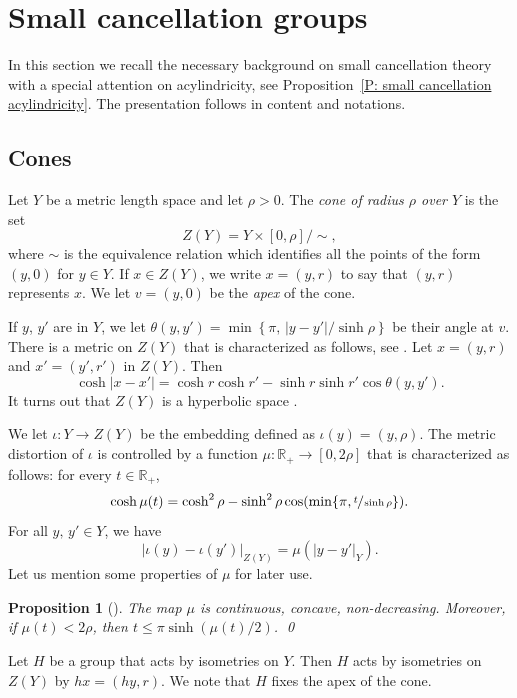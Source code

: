 \documentclass[11pt]{article}
\theoremstyle{plain}
\newtheorem{prop}[thm]{Proposition}
\theoremstyle{definition}
\begin{document}
\section{Small cancellation groups}
In this section we recall the necessary background on small cancellation theory with a special attention on acylindricity, see Proposition~\ref{P: small cancellation acylindricity}.
The presentation follows \cite{coulon_geometry_2014} in content and notations.

\subsection{Cones}

Let $Y$ be a metric length space and let $\rho>0$.
The \emph{cone of radius $\rho$ over $Y$} is the set
\[
Z(Y)= Y\times [0,\rho]/\sim,
\]
where $\sim$ is the equivalence relation which identifies all the points of the form $(y,0)$ for $y \in Y$.
If $x\in Z (Y)$, we write $x=(y,r)$ to say that $(y,r)$ represents $x$. We let $v=(y,0)$ be the \emph{apex} of the cone.

If $y$, $y'$ are in $Y$, we let $\theta(y,y')=\min\left\{ \pi,\, |y-y'|/\sinh\rho\right\}$ be their angle at $v$. There is a metric on $Z(Y)$ that is characterized as follows, see \cite[Ch.\,I.5]{bridson_metric_1999}.
Let $x=(y,r)$ and $x'=(y',r')$ in $Z(Y)$. Then
\[
\cosh |x-x'| = \cosh r \cosh r' -\sinh r \sinh r' \cos \theta (y,y').
\]
It turns out that $Z(Y)$ is a hyperbolic space \cite[Prop.\,4.6]{coulon_geometry_2014}.

We let $\iota: Y \to Z(Y)$ be the embedding defined as $\iota(y)=(y,\rho)$. The metric distortion of $\iota$ is controlled by a function $\mu: \mathbb{R}_+ \to [0,2\rho]$ that is characterized as follows: for every $ t\in \mathbb{R}_+$,
\[
\cosh \mu(t) = \cosh^2 \rho - \sinh^2 \rho \cos( \min\{\pi, \sfrac t{\sinh \rho}\}).
\]
For all $y,\, y' \in Y$, we have
\begin{equation}
\label{L: distortion} |\iota(y)-\iota(y')|_{Z(Y)}=\mu(|y-y'|_Y).
\end{equation}
Let us mention some properties of $\mu$ for later use.

\begin{prop}[{\cite[Prop.\,4.4]{coulon_geometry_2014}}]\label{P: mu} The map $\mu$ is continuous, concave, non-decreasing. Moreover, if $\mu(t)< 2\rho$, then $t \leqslant \pi \sinh (\mu(t)/2)$. \qed
\end{prop}

Let $H$ be a group that acts by isometries on $Y$. Then $H$ acts by isometries on $Z(Y)$ by $hx=(hy,r)$. We note that $H$ fixes the apex of the cone.
\end{document}
